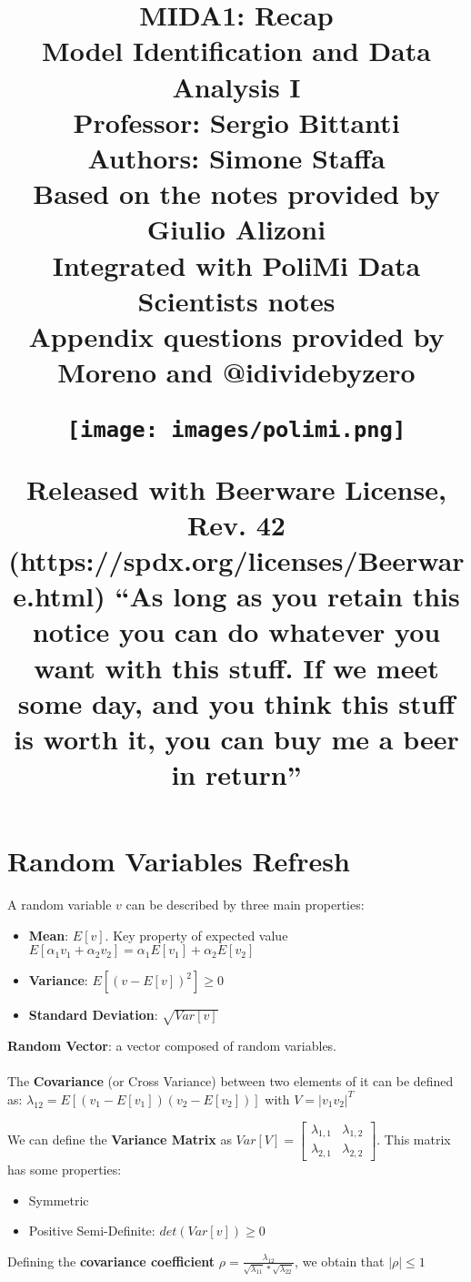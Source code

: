 \documentclass[10pt,a4paper]{article}
\title{{\Huge\textbf{MIDA1: Recap}
\\ \LARGE Model Identification and Data Analysis I
\\ \large \textbf{Professor}: Sergio Bittanti  \linebreak
\\ \small \textbf{Authors}: Simone Staffa \linebreak
\\ \small Based on the notes provided by Giulio Alizoni
\\ \small Integrated with PoliMi Data Scientists notes
\\ \small Appendix questions provided by Moreno and @idividebyzero

\vspace{5em}
\begin{figure}[h!]
 \hfill \texttt{[image: images/polimi.png]}\hspace*{\fill}
  \label{fig:polimi}
\end{figure}
}
\vspace{1em}
\small{
Released with Beerware License, Rev. 42 (https://spdx.org/licenses/Beerware.html) \linebreak
“As long as you retain this notice you can do whatever you want with this stuff. If we meet some day, and you think this stuff is worth it, you can buy me a beer in return”}
}
\begin{document}
\maketitle
\clearpage
\tableofcontents
\clearpage
\section{Random Variables Refresh}
A random variable $v$ can be described by three main properties:
\begin{itemize}
	\item \textbf{Mean}: $E[v]$. Key property of expected value $E[\alpha_1v_1+\alpha_2v_2] = \alpha_1E[v_1] + \alpha_2E[v_2] $
	\item \textbf{Variance}: $E[(v-E[v])^2] \geq 0$
	\item \textbf{Standard Deviation}: $\sqrt{Var[v]}$
\end{itemize}
\textbf{Random Vector}: a vector composed of random variables.
\\ \\
The \textbf{Covariance} (or Cross Variance) between two elements of it can be defined as:
\center 
$\lambda_{12} = E[(v_1-E[v_1])(v_2-E[v_2])]$ with $V = | v_1 v_2 |^T$
\\
\vspace{1em}
\raggedright
We can define the \textbf{Variance Matrix} as $Var[V]=	\begin{bmatrix}
\lambda_{1,1} & \lambda_{1,2} \\
\lambda_{2,1} & \lambda_{2,2}
\end{bmatrix}$.
This matrix has some properties:
\begin{itemize}
	\item Symmetric
	\item Positive Semi-Definite: $det(Var[v]) \geq 0$
\end{itemize}
Defining the \textbf{covariance coefficient} $\rho=\frac{\lambda_{12}}{\sqrt{\lambda_{11}}*\sqrt{\lambda_{22}}}$, we obtain that $|\rho| \leq 1 $
\end{document}
